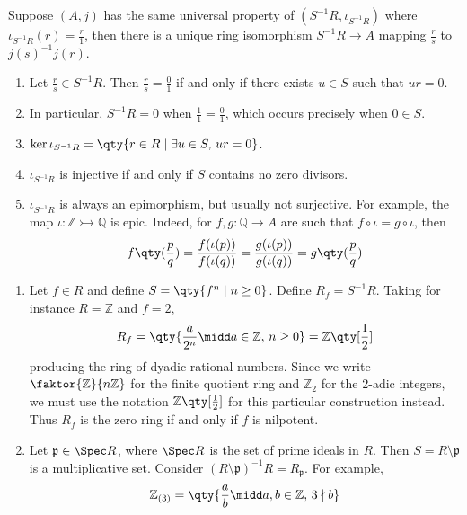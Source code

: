 \begin{proposition}
    Suppose \( (A, j) \) has the same universal property of \( (S^{-1}R, \iota_{S^{-1}R}) \) where \( \iota_{S^{-1}R}(r) = \frac{r}{1} \), then there is a unique ring isomorphism \( S^{-1}R \to A \) mapping \( \frac{r}{s} \) to \( j(s)^{-1} j(r) \).
\end{proposition}
\begin{remark}
    \begin{enumerate}
        \item Let \( \frac{r}{s} \in S^{-1}R \).
        Then \( \frac{r}{s} = \frac{0}{1} \) if and only if there exists \( u \in S \) such that \( ur = 0 \).
        \item In particular, \( S^{-1}R = 0 \) when \( \frac{1}{1} = \frac{0}{1} \), which occurs precisely when \( 0 \in S \).
        \item \( \ker \iota_{S^{-1}R} = \qty{r \in R \mid \exists u \in S,\, ur = 0} \).
        \item \( \iota_{S^{-1}R} \) is injective if and only if \( S \) contains no zero divisors.
        \item \( \iota_{S^{-1}R} \) is always an epimorphism, but usually not surjective.
        For example, the map \( \iota : \mathbb Z \rightarrowtail \mathbb Q \) is epic.
        Indeed, for \( f, g : \mathbb Q \to A \) are such that \( f \circ \iota = g \circ \iota \), then
        \[ f\qty(\frac{p}{q}) = \frac{f(\iota(p))}{f(\iota(q))} = \frac{g(\iota(p))}{g(\iota(q))} = g\qty(\frac{p}{q}) \]
    \end{enumerate}
\end{remark}
\begin{example}
    \begin{enumerate}
        \item Let \( f \in R \) and define \( S = \qty{f^n \mid n \geq 0} \).
        Define \( R_f = S^{-1}R \).
        Taking for instance \( R = \mathbb Z \) and \( f = 2 \),
        \[ R_f = \qty{\frac{a}{2^n} \midd a \in \mathbb Z,\, n \geq 0} = \mathbb Z\qty[\frac{1}{2}] \]
        producing the ring of dyadic rational numbers.
        Since we write \( \faktor{\mathbb Z}{n\mathbb Z} \) for the finite quotient ring and \( \mathbb Z_2 \) for the 2-adic integers, we must use the notation \( \mathbb Z\qty[\frac{1}{2}] \) for this particular construction instead.
        Thus \( R_f \) is the zero ring if and only if \( f \) is nilpotent.
        \item Let \( \mathfrak p \in \Spec R \), where \( \Spec R \) is the set of prime ideals in \( R \).
        Then \( S = R \setminus \mathfrak p \) is a multiplicative set.
        Consider \( (R \setminus \mathfrak p)^{-1} R = R_{\mathfrak p} \).
        For example,
        \[ \mathbb Z_{(3)} = \qty{\frac{a}{b} \midd a, b \in \mathbb Z,\, 3 \nmid b} \]
    \end{enumerate}
\end{example}


